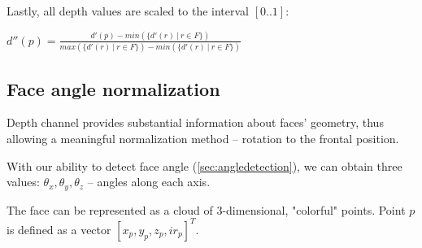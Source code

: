         Lastly, all depth values are scaled to the interval $[0..1]$:
        \begin{center}
        $
          d''(p) = \frac{d'(p) - min(\{d'(r)\ |\ r \in F\})}{max(\{d'(r)\ |\ r \in F\}) - min(\{d'(r)\ |\ r \in F\})}
        $
        \end{center}

        \subsection*{Face angle normalization}
        Depth channel provides substantial information about faces' geometry, thus allowing
        a meaningful normalization method -- rotation to the frontal position.

        With our ability to detect face angle (\ref{sec:angledetection}), we can obtain
        three values: $\theta_x, \theta_y, \theta_z$ -- angles along each axis.

        The face can be represented as a cloud of $3$-dimensional, "colorful" points.
        Point $p$ is defined as a vector $[x_p, y_p, z_p, ir_p]^{T}$.


